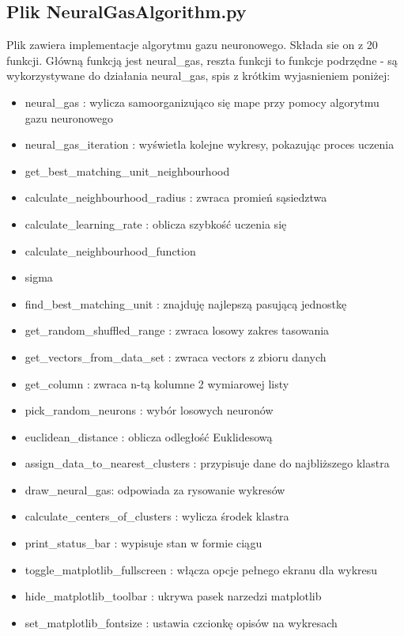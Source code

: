 \documentclass{classrep}
\begin{document}
{	\subsection{Plik  NeuralGasAlgorithm.py}
	{
		Plik zawiera implementacje algorytmu gazu neuronowego. Składa sie on z 20 funkcji. Główną funkcją jest neural\_gas, reszta funkcji to funkcje podrzędne - są wykorzystywane do działania neural\_gas, spis z krótkim wyjasnieniem poniżej: 
\begin{itemize}
\item neural\_gas : wylicza samoorganizująco się mape przy pomocy algorytmu gazu neuronowego
\item neural\_gas\_iteration : wyświetla kolejne wykresy, pokazując proces uczenia
\item get\_best\_matching\_unit\_neighbourhood
\item calculate\_neighbourhood\_radius : zwraca promień sąsiedztwa
\item calculate\_learning\_rate : oblicza szybkość uczenia się
\item calculate\_neighbourhood\_function
\item sigma
\item find\_best\_matching\_unit : znajduję najlepszą pasującą jednostkę
\item get\_random\_shuffled\_range : zwraca losowy zakres tasowania
\item get\_vectors\_from\_data\_set : zwraca vectors z zbioru danych
\item get\_column : zwraca n-tą kolumne 2 wymiarowej listy
\item pick\_random\_neurons : wybór losowych neuronów
\item euclidean\_distance : oblicza odległość Euklidesową
\item assign\_data\_to\_nearest\_clusters : przypisuje dane do najbliższego klastra
\item draw\_neural\_gas: odpowiada za rysowanie wykresów
\item calculate\_centers\_of\_clusters : wylicza środek klastra
\item print\_status\_bar : wypisuje stan w formie ciągu
\item toggle\_matplotlib\_fullscreen : włącza opcje pełnego ekranu dla wykresu
\item hide\_matplotlib\_toolbar : ukrywa pasek narzedzi matplotlib
\item set\_matplotlib\_fontsize : ustawia czcionkę opisów na wykresach
\end{itemize}
	}
	
}
\end{document}
